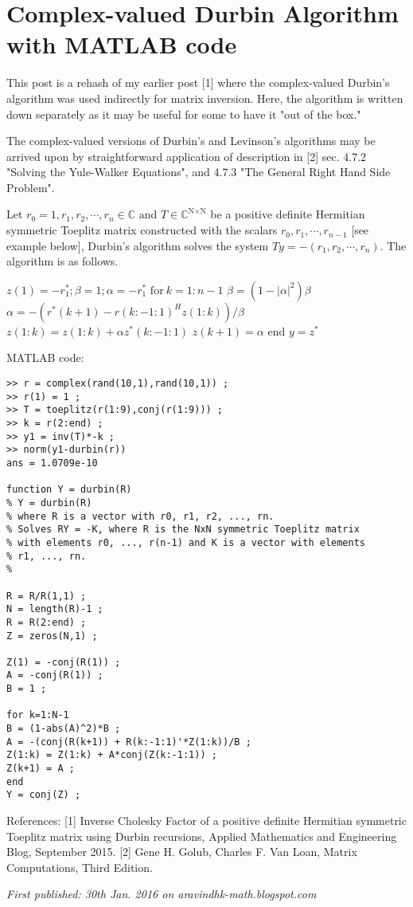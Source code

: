 \section{Complex-valued Durbin Algorithm with MATLAB code}

This post is a rehash of my earlier post [1] where the complex-valued Durbin's algorithm was used indirectly for matrix inversion. Here, the algorithm is written down separately as it may be useful for some to have it "out of the box."

The complex-valued versions of Durbin's and Levinson's algorithms may be arrived upon by straightforward application of description in [2] sec. 4.7.2 "Solving the Yule-Walker Equations", and 4.7.3 "The General Right Hand Side Problem".

Let $r_0 = 1, r_1, r_2, \cdots, r_n \in \mathbb{C}$ and $T \in \mathbb{C}^{\text{N}\times\text{N}}$ be a positive definite Hermitian symmetric Toeplitz matrix constructed with the scalars $r_0, r_1, \cdots, r_{n-1}$ [see example below], Durbin's algorithm solves the system $Ty=-(r_1, r_2, \cdots, r_n)$. The algorithm is as follows.

$z(1) = -r_1^*; \beta=1; \alpha=-r_1^*$
$\text{for}~ k = 1:n-1$
$\beta = (1-|\alpha|^2)\beta$
$\alpha = - (r^*(k+1) - r(k:-1:1)^H z(1:k))/\beta$
$z(1:k) = z(1:k) + \alpha z^*(k:-1:1)$
$z(k+1) = \alpha$
$\text{end}$
$y = z^*$

MATLAB code:

\begin{verbatim}
>> r = complex(rand(10,1),rand(10,1)) ;
>> r(1) = 1 ;
>> T = toeplitz(r(1:9),conj(r(1:9))) ;
>> k = r(2:end) ;
>> y1 = inv(T)*-k ;
>> norm(y1-durbin(r))
ans = 1.0709e-10

function Y = durbin(R)
% Y = durbin(R)
% where R is a vector with r0, r1, r2, ..., rn.
% Solves RY = -K, where R is the NxN symmetric Toeplitz matrix 
% with elements r0, ..., r(n-1) and K is a vector with elements
% r1, ..., rn.
%

R = R/R(1,1) ;
N = length(R)-1 ;
R = R(2:end) ;
Z = zeros(N,1) ;

Z(1) = -conj(R(1)) ;
A = -conj(R(1)) ;
B = 1 ;

for k=1:N-1
B = (1-abs(A)^2)*B ;
A = -(conj(R(k+1)) + R(k:-1:1)'*Z(1:k))/B ;
Z(1:k) = Z(1:k) + A*conj(Z(k:-1:1)) ;
Z(k+1) = A ;
end
Y = conj(Z) ;
\end{verbatim}

References:
[1] Inverse Cholesky Factor of a positive definite Hermitian symmetric Toeplitz matrix using Durbin recursions, Applied Mathematics and Engineering Blog, September 2015.
[2] Gene H. Golub, Charles F. Van Loan, Matrix Computations, Third Edition.

\emph{First published: 30th Jan. 2016 on aravindhk-math.blogspot.com}
